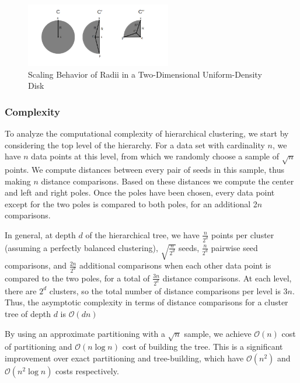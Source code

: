 \begin{figure}[ht!]
    \centering
    \includegraphics[width=2.5in]{images/geometry/sketchometry_final.png}
    \caption{Scaling Behavior of Radii in a Two-Dimensional Uniform-Density Disk}
    \label{fig:methods:scaling_behavior}
\end{figure}

\subsubsection {Complexity}
\label{subsubsec:methods:clustering:complexity}

To analyze the computational complexity of hierarchical
clustering, we start by considering the top level of the hierarchy. 
For a data set with cardinality $n$, we have $n$ data points at this 
level, from which we randomly choose a sample of $\sqrt{n}$ points. 
We compute distances between every pair of seeds in this sample, 
thus making $n$ distance comparisons. Based on these distances 
we compute the center and left and right poles. Once the poles 
have been chosen, every data point except for the two poles is 
compared to both poles, for an additional 2$n$ comparisons. 


In general, at depth $d$ of
the hierarchical tree, we have $\frac{n}{2^d}$ points per cluster (assuming a
perfectly balanced clustering), $\sqrt{\frac{n}{2^d}}$ seeds, $\frac{n}{2^d}$
pairwise seed comparisons, and $\frac{2n}{2^{d}}$ additional comparisons when 
each other data point is compared to the two poles, for a total of $\frac{3n}{2^d}$
distance comparisons. At each level, there are $2^d$ clusters,
so the total number of distance comparisons per level is
3$n$. Thus, the asymptotic complexity in terms of distance
comparisons for a cluster tree of depth $d$ is $\mathcal{O}(dn)$

By using an approximate partitioning with a $\sqrt{n}$ sample, we achieve $\mathcal{O}(n)$ cost of 
partitioning and $\mathcal{O}(n \log n)$ cost of building the tree. This is a significant improvement over 
exact partitioning and tree-building, which have $\mathcal{O}(n^2)$ and $\mathcal{O}(n^2 \log n)$ costs respectively.


